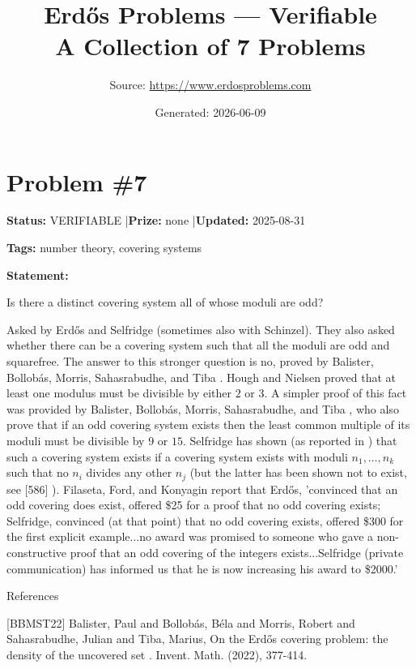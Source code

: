 \documentclass{article}
\title{Erd\H{o}s Problems --- Verifiable\\[0.5em]\large A Collection of 7 Problems}
\date{Generated: 2026-06-09}
\author{Source: \url{https://www.erdosproblems.com}}
\begin{document}
\maketitle
\tableofcontents
\newpage


\section{Problem \#7}
\label{prob:7}

\noindent\textbf{Status:} VERIFIABLE \quad|\quad \textbf{Prize:} none \quad|\quad \textbf{Updated:} 2025-08-31

\noindent\textbf{Tags:} number theory, covering systems

\medskip

\noindent\textbf{Statement:}

Is there a distinct covering system all of whose moduli are odd?




Asked by Erd\H{o}s and Selfridge (sometimes also with Schinzel). They also asked whether there can be a covering system such that all the moduli are odd and squarefree. The answer to this stronger question is no, proved by Balister, Bollob\'{a}s, Morris, Sahasrabudhe, and Tiba \cite{BBMST22}. Hough and Nielsen \cite{HoNi19} proved that at least one modulus must be divisible by either $2$ or $3$. A simpler proof of this fact was provided by Balister, Bollob\'{a}s, Morris, Sahasrabudhe, and Tiba \cite{BBMST22}, who also prove that if an odd covering system exists then the least common multiple of its moduli must be divisible by $9$ or $15$. Selfridge has shown (as reported in \cite{Sc67}) that such a covering system exists if a covering system exists with moduli $n_1,\ldots,n_k$ such that no $n_i$ divides any other $n_j$ (but the latter has been shown not to exist, see [586] ). Filaseta, Ford, and Konyagin \cite{FFK00} report that Erd\H{o}s, 'convinced that an odd covering does exist, offered \$25 for a proof that no odd covering exists; Selfridge, convinced (at that point) that no odd covering exists, offered \$300 for the first explicit example...no award was promised to someone who gave a non-constructive proof that an odd covering of the integers exists...Selfridge (private communication) has informed us that he is now increasing his award to \$2000.'




References

[BBMST22] Balister, Paul and Bollob\'{a}s, B\'{e}la and Morris, Robert and Sahasrabudhe, Julian and Tiba, Marius, On the Erd\H{o}s covering problem: the density of the uncovered set . Invent. Math. (2022), 377-414.
\end{document}
